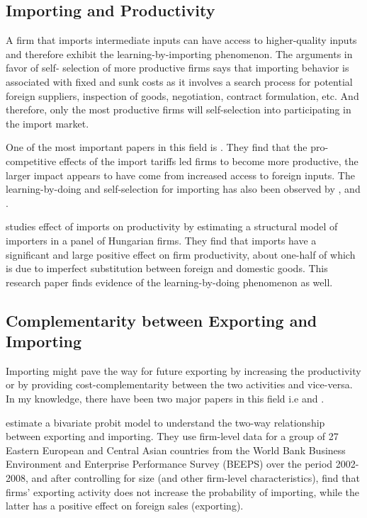 \documentclass[12pt]{article}
\begin{document}
\subsection*{Importing and Productivity}

A firm that imports intermediate inputs can have access to higher-quality inputs and
therefore exhibit the learning-by-importing phenomenon. The arguments in favor of self-
selection of more productive firms says that importing behavior is associated with fixed and
sunk costs as it involves a search process for potential foreign suppliers, inspection of goods,
negotiation, contract formulation, etc. And therefore, only the most productive firms will
self-selection into participating in the import market.

One of the most important papers in this field
is \textcite{topalova2011trade}. They find that the pro-competitive
effects of the import tariffs led firms to become more
productive, the larger impact appears to have come from 
increased access to foreign inputs. The learning-by-doing and
self-selection for importing has also been observed by
\textcite{muuls2009imports}, and \textcite{kasahara2008does}. 

\textcite{halpern2011imported} studies effect of imports on productivity by estimating a structural
model of importers in a panel of Hungarian firms. They find that imports have
a significant and large positive effect on firm productivity, about one-half of which is due
to imperfect substitution between foreign and domestic goods. This
research paper finds evidence of the learning-by-doing phenomenon as
well.  

\subsection*{Complementarity between Exporting and Importing}

Importing  might pave the way for future
exporting by increasing the productivity or by providing
cost-complementarity between the two activities and vice-versa. 
In my knowledge, there have been two major papers in this field
i.e \textcite{aristei2013firms} and \textcite{kasahara2013productivity}. 

\textcite{aristei2013firms} estimate a bivariate probit model to
understand the two-way relationship between exporting and importing. 
They use  firm-level data for a group of 27 Eastern European and 
Central Asian countries from the World Bank Business Environment 
and Enterprise Performance Survey (BEEPS) over the period 2002-2008, 
and after controlling for size (and other firm-level characteristics),
find that firms’ exporting activity does not increase the
probability of importing, while the latter has a positive effect
 on foreign sales (exporting). 
\end{document}
